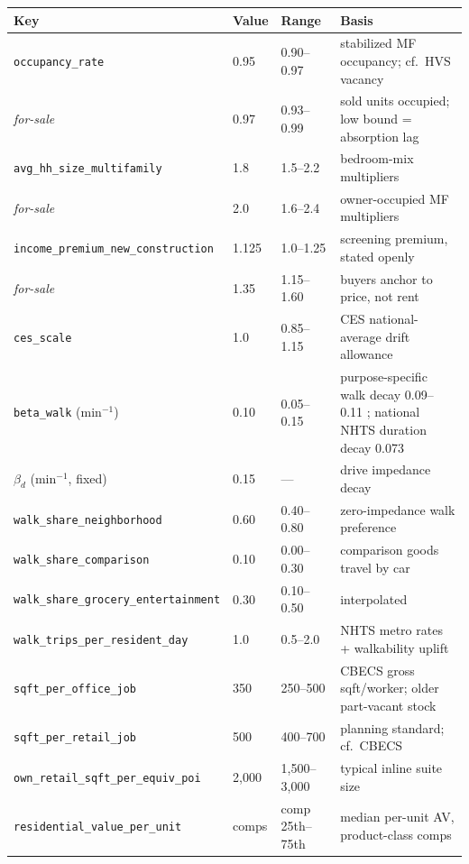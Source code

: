 \documentclass[11pt]{article}
\newcommand{\assum}[1]{\texttt{#1}}
\begin{document}
\begin{center}
\footnotesize
\begin{tabular}{@{}llll@{}}
\toprule
Key & Value & Range & Basis \\
\midrule
\assum{occupancy\_rate} & 0.95 & 0.90--0.97 & stabilized MF occupancy; cf.\ HVS vacancy \cite{hvs} \\
\quad\emph{for-sale} & 0.97 & 0.93--0.99 & sold units occupied; low bound = absorption lag \\
\assum{avg\_hh\_size\_multifamily} & 1.8 & 1.5--2.2 & bedroom-mix multipliers \cite{listokin2006} \\
\quad\emph{for-sale} & 2.0 & 1.6--2.4 & owner-occupied MF multipliers \cite{listokin2006} \\
\assum{income\_premium\_new\_construction} & 1.125 & 1.0--1.25 & screening premium, stated openly \\
\quad\emph{for-sale} & 1.35 & 1.15--1.60 & buyers anchor to price, not rent \\
\assum{ces\_scale} & 1.0 & 0.85--1.15 & CES national-average drift allowance \cite{blsces} \\
\assum{beta\_walk} (min$^{-1}$) & 0.10 & 0.05--0.15 & purpose-specific walk decay 0.09--0.11 \cite{iacono2008}; national NHTS duration decay 0.073 \cite{yang2012} \\
$\beta_d$ (min$^{-1}$, fixed) & 0.15 & --- & drive impedance decay \\
\assum{walk\_share\_neighborhood} & 0.60 & 0.40--0.80 & zero-impedance walk preference \\
\assum{walk\_share\_comparison} & 0.10 & 0.00--0.30 & comparison goods travel by car \\
\assum{walk\_share\_grocery\_entertainment} & 0.30 & 0.10--0.50 & interpolated \\
\assum{walk\_trips\_per\_resident\_day} & 1.0 & 0.5--2.0 & NHTS metro rates + walkability uplift \cite{nhts, ewing2010} \\
\assum{sqft\_per\_office\_job} & 350 & 250--500 & CBECS gross sqft/worker; older part-vacant stock \cite{cbecs} \\
\assum{sqft\_per\_retail\_job} & 500 & 400--700 & planning standard; cf.\ CBECS \cite{cbecs} \\
\assum{own\_retail\_sqft\_per\_equiv\_poi} & 2{,}000 & 1{,}500--3{,}000 & typical inline suite size \\
\assum{residential\_value\_per\_unit} & comps & comp 25th--75th & median per-unit AV, product-class comps \\

\end{tabular}
\end{center}
\end{document}
